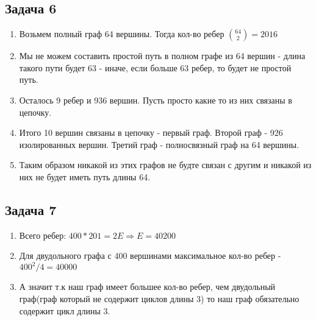 \documentclass[a4paper,12pt]{article}
\begin{document}
\subsection{Задача 6}
\begin{enumerate}
    \item Возьмем полный граф 64 вершины. Тогда кол-во ребер $\binom{64}{2}=2016$ 
    \item Мы не можем составить простой путь в полном графе из 64 вершин - длина такого пути будет 63 - иначе, если больше 63 ребер, то будет не простой путь.
    \item Осталось 9 ребер и 936 вершин. Пусть просто какие то из них связаны в цепочку.
    \item Итого 10 вершин связаны в цепочку - первый граф. Второй граф - 926 изолированных вершин. Третий граф - полносвязный граф на 64 вершины.
    \item Таким образом никакой из этих графов не будте связан с другим и никакой из них не будет иметь путь длины 64.
\end{enumerate}

\subsection{Задача 7}
\begin{enumerate}
    \item Всего ребер: $400*201 = 2E \Rightarrow E=40200$ 
    \item Для двудольного графа с 400 вершинами максимальное кол-во ребер - $400^2/4 = 40000$
    \item А значит т.к наш граф имеет большее кол-во ребер, чем двудольный граф(граф который не содержит циклов длины 3) то наш граф обязательно содержит цикл длины 3.
\end{enumerate}
\end{document}
